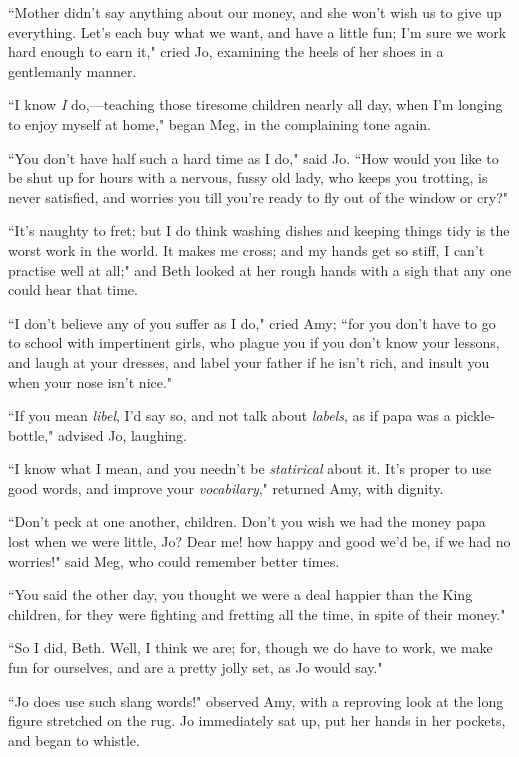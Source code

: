 ``Mother didn't say anything about our money, and she
won't wish us to give up everything.
Let's each buy what we want, and have a little fun;
I'm sure we work hard enough to earn it," cried Jo,
examining the heels of her shoes in a gentlemanly manner.

``I know \emph{I} do,---teaching those tiresome children nearly all day,
when I'm longing to enjoy myself at home," began Meg, in
the complaining tone again.

``You don't have half such a hard time as I do," said Jo.
``How would you like to be shut up for hours with a nervous, fussy old
lady, who keeps you trotting, is never satisfied, and worries you till
you're ready to fly out of the window or cry?"

``It's naughty to fret; but I do think washing dishes and
keeping things tidy is the worst work in the world. It makes me cross;
and my hands get so stiff, I can't practise well at
all;" and Beth looked at her rough hands with a sigh that any one could
hear that time.

``I don't believe any of you suffer as I do," cried Amy;
``for you don't have to go to school with impertinent
girls, who plague you if you don't know your lessons,
and laugh at your dresses, and label your father if he
isn't rich, and insult you when your nose
isn't nice."

``If you mean \emph{libel}, I'd say so, and not talk
about \emph{labels}, as if papa was a pickle-bottle," advised Jo,
laughing.

``I know what I mean, and you needn't be
\emph{statirical} about it. It's proper to use good
words, and improve your \emph{vocabilary}," returned Amy, with dignity.

``Don't peck at one another, children.
Don't you wish we had the money papa lost when we were
little, Jo? Dear me! how happy and good we'd be, if we
had no worries!" said Meg, who could remember better times.

``You said the other day, you thought we were a deal happier than the
King children, for they were fighting and fretting all the time, in
spite of their money."

``So I did, Beth. Well, I think we are; for, though we do have to work,
we make fun for ourselves, and are a pretty jolly set, as Jo would say."

``Jo does use such slang words!" observed Amy, with a reproving look at
the long figure stretched on the rug. Jo immediately sat up, put her
hands in her pockets, and began to whistle.


